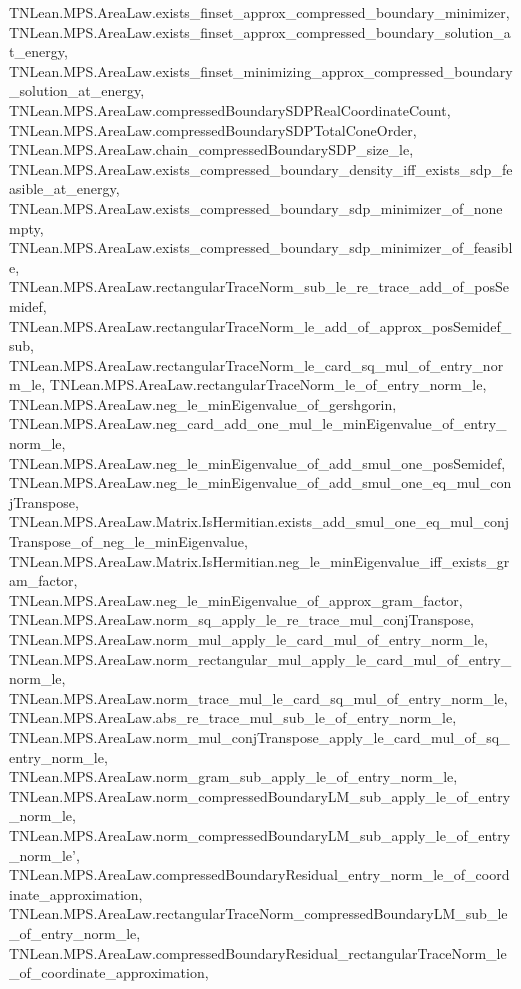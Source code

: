 \begin{lemma}
{        TNLean.MPS.AreaLaw.exists_finset_approx_compressed_boundary_minimizer,
        TNLean.MPS.AreaLaw.exists_finset_approx_compressed_boundary_solution_at_energy,
        TNLean.MPS.AreaLaw.exists_finset_minimizing_approx_compressed_boundary_solution_at_energy,
        TNLean.MPS.AreaLaw.compressedBoundarySDPRealCoordinateCount,
        TNLean.MPS.AreaLaw.compressedBoundarySDPTotalConeOrder,
        TNLean.MPS.AreaLaw.chain_compressedBoundarySDP_size_le,
        TNLean.MPS.AreaLaw.exists_compressed_boundary_density_iff_exists_sdp_feasible_at_energy,
        TNLean.MPS.AreaLaw.exists_compressed_boundary_sdp_minimizer_of_nonempty,
        TNLean.MPS.AreaLaw.exists_compressed_boundary_sdp_minimizer_of_feasible,
        TNLean.MPS.AreaLaw.rectangularTraceNorm_sub_le_re_trace_add_of_posSemidef,
        TNLean.MPS.AreaLaw.rectangularTraceNorm_le_add_of_approx_posSemidef_sub,
        TNLean.MPS.AreaLaw.rectangularTraceNorm_le_card_sq_mul_of_entry_norm_le,
        TNLean.MPS.AreaLaw.rectangularTraceNorm_le_of_entry_norm_le,
        TNLean.MPS.AreaLaw.neg_le_minEigenvalue_of_gershgorin,
        TNLean.MPS.AreaLaw.neg_card_add_one_mul_le_minEigenvalue_of_entry_norm_le,
        TNLean.MPS.AreaLaw.neg_le_minEigenvalue_of_add_smul_one_posSemidef,
        TNLean.MPS.AreaLaw.neg_le_minEigenvalue_of_add_smul_one_eq_mul_conjTranspose,
        TNLean.MPS.AreaLaw.Matrix.IsHermitian.exists_add_smul_one_eq_mul_conjTranspose_of_neg_le_minEigenvalue,
        TNLean.MPS.AreaLaw.Matrix.IsHermitian.neg_le_minEigenvalue_iff_exists_gram_factor,
        TNLean.MPS.AreaLaw.neg_le_minEigenvalue_of_approx_gram_factor,
        TNLean.MPS.AreaLaw.norm_sq_apply_le_re_trace_mul_conjTranspose,
        TNLean.MPS.AreaLaw.norm_mul_apply_le_card_mul_of_entry_norm_le,
        TNLean.MPS.AreaLaw.norm_rectangular_mul_apply_le_card_mul_of_entry_norm_le,
        TNLean.MPS.AreaLaw.norm_trace_mul_le_card_sq_mul_of_entry_norm_le,
        TNLean.MPS.AreaLaw.abs_re_trace_mul_sub_le_of_entry_norm_le,
        TNLean.MPS.AreaLaw.norm_mul_conjTranspose_apply_le_card_mul_of_sq_entry_norm_le,
        TNLean.MPS.AreaLaw.norm_gram_sub_apply_le_of_entry_norm_le,
        TNLean.MPS.AreaLaw.norm_compressedBoundaryLM_sub_apply_le_of_entry_norm_le,
        TNLean.MPS.AreaLaw.norm_compressedBoundaryLM_sub_apply_le_of_entry_norm_le',
        TNLean.MPS.AreaLaw.compressedBoundaryResidual_entry_norm_le_of_coordinate_approximation,
        TNLean.MPS.AreaLaw.rectangularTraceNorm_compressedBoundaryLM_sub_le_of_entry_norm_le,
        TNLean.MPS.AreaLaw.compressedBoundaryResidual_rectangularTraceNorm_le_of_coordinate_approximation,
}
\end{lemma}
